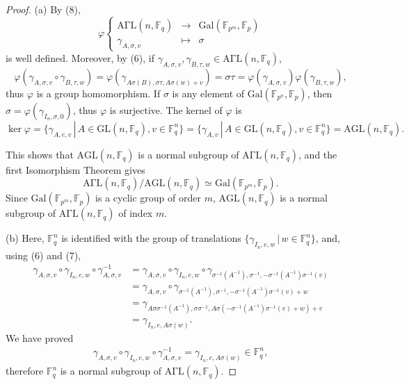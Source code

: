 \documentclass[11pt,a4paper]{article}
\newcommand{\F}{\mathbb{F}}
\newcommand{\Gal}{\mathrm{Gal}}
\begin{document}
 \begin{proof}
 \item[(a)] 
 By (8),
 $$
 \varphi
 \left\{
 \begin{array}{ccc}
 \mathrm{A\Gamma L}(n,\F_q) &\to & \Gal(\F_{p^m},\F_p)\\
 \gamma_{A,\sigma,v} & \mapsto & \sigma
 \end{array}
 \right.
 $$
 is well defined. Moreover, by (6), if $\gamma_{A,\sigma,v}, \gamma_{B,\tau,w} \in \mathrm{A\Gamma L}(n,\F_q)$,
 $$\varphi(\gamma_{A,\sigma,v} \circ \gamma_{B,\tau,w} ) = \varphi( \gamma_{A\sigma(B),\sigma \tau,A \sigma(w) + v}) =\sigma \tau = \varphi(\gamma_{A,\sigma,v})\varphi( \gamma_{B,\tau,w}),
 $$
 thus $\varphi$ is a group homomorphism. If $\sigma$ is any element of $\Gal(\F_{p^n},\F_p)$, then $\sigma = \varphi(\gamma_{I_n, \sigma,0})$, thus $\varphi$ is surjective. The kernel of $\varphi$ is
 $$\ker \varphi = \{\gamma_{A,e,v}\, | \, A\in \mathrm{GL}(n,\F_q), v \in \F_q^n\} = \{\gamma_{A,v}\, | \, A\in \mathrm{GL}(n,\F_q), v \in \F_q^n\} = \mathrm{AGL}(n,\F_q).$$

This shows that $\mathrm{AGL}(n,\F_q)$ is a normal subgroup of $\mathrm{A\Gamma L}(n,\F_q)$, and the first Isomorphism Theorem gives
$$ \mathrm{A\Gamma L}(n,\F_q)/ \mathrm{AGL}(n,\F_q) \simeq \Gal(\F_{p^m},\F_p).$$
Since $\Gal(\F_{p^m},\F_p)$ is a cyclic group of order $m$, $\mathrm{AGL}(n,\F_q)$ is a normal subgroup of $\mathrm{A\Gamma L}(n,\F_q)$ of index $m$.

\item[(b)] Here, $\F_q^n$ is identified with the group of translations $\{\gamma_{I_n,e,w}\,|\, w \in \F_q^n\}$, and, using (6) and (7),
\begin{align*}
\gamma_{A,\sigma,v} \circ \gamma_{I_n,e,w} \circ \gamma_{A,\sigma,v}^{-1} &= \gamma_{A,\sigma,v} \circ \gamma_{I_n,e,w}  \circ \gamma_{\sigma^{-1}(A^{-1}),\sigma^{-1},- \sigma^{-1}(A^{-1})\sigma^{-1}(v)}\\
&= \gamma_{A,\sigma,v} \circ  \gamma_{\sigma^{-1}(A^{-1}),\sigma^{-1},-\sigma^{-1}(A^{-1}) \sigma^{-1}(v) + w}\\
&=\gamma_{A \sigma \sigma^{-1}(A^{-1}),\sigma \sigma^{-1}, A\sigma(-\sigma^{-1}(A^{-1}) \sigma^{-1}(v) + w) + v}\\
&= \gamma_{I_n,e,A\sigma(w)}.
\end{align*}
We have proved
\begin{align}
\gamma_{A,\sigma,v} \circ \gamma_{I_n,e,w} \circ \gamma_{A,\sigma,v}^{-1} = \gamma_{I_n,e,A\sigma(w)} \in \F_q^n,
\end{align}
therefore $\F_q^n$ is a normal subgroup of $\mathrm{A\Gamma L}(n,\F_q)$.


\end{proof}
\end{document}

